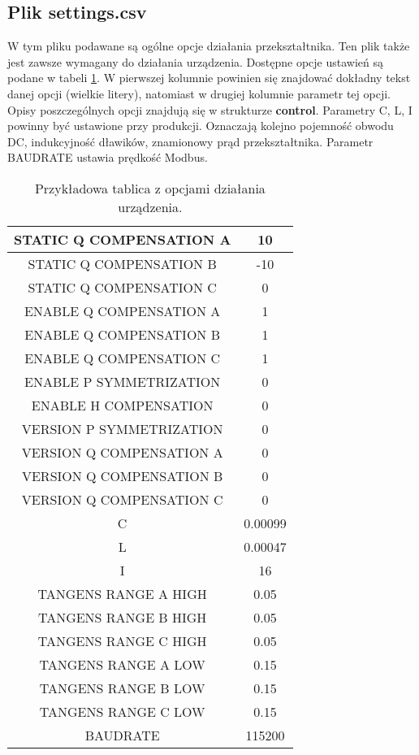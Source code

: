 \documentclass[12pt,a4paper]{article}
\begin{document}
\subsection{Plik settings.csv}
W tym pliku podawane są ogólne opcje działania przekształtnika. Ten plik także jest zawsze wymagany do działania urządzenia. Dostępne opcje ustawień są podane w tabeli \ref{tab:settings}. W pierwszej kolumnie powinien się znajdować dokładny tekst danej opcji (wielkie litery), natomiast w drugiej kolumnie parametr tej opcji. Opisy poszczególnych opcji znajdują się w strukturze \textbf{control}. Parametry C, L, I powinny być ustawione przy produkcji. Oznaczają kolejno pojemność obwodu DC, indukcyjność dławików, znamionowy prąd przekształtnika. Parametr BAUDRATE ustawia prędkość Modbus.

\begin{table}[]
	\centering
	\begin{tabular}{|c|c|}
		\hline
		STATIC Q COMPENSATION A & 10 \\ \hline
		STATIC Q COMPENSATION B & -10 \\ \hline
		STATIC Q COMPENSATION C & 0 \\ \hline
		ENABLE Q COMPENSATION A & 1 \\ \hline
		ENABLE Q COMPENSATION B & 1 \\ \hline
		ENABLE Q COMPENSATION C & 1 \\ \hline
		ENABLE P SYMMETRIZATION & 0 \\ \hline
		ENABLE H COMPENSATION & 0 \\ \hline
		VERSION P SYMMETRIZATION & 0 \\ \hline
		VERSION Q COMPENSATION A & 0 \\ \hline
		VERSION Q COMPENSATION B & 0 \\ \hline
		VERSION Q COMPENSATION C & 0 \\ \hline
		C & 0.00099 \\ \hline
		L & 0.00047 \\ \hline
		I & 16 \\ \hline
		TANGENS RANGE A HIGH & 0.05 \\ \hline
		TANGENS RANGE B HIGH & 0.05 \\ \hline
		TANGENS RANGE C HIGH & 0.05 \\ \hline
		TANGENS RANGE A LOW & 0.15 \\ \hline
		TANGENS RANGE B LOW & 0.15 \\ \hline
		TANGENS RANGE C LOW & 0.15 \\ \hline
		BAUDRATE & 115200 \\ \hline
	\end{tabular}
\caption{\label{tab:settings}Przykładowa tablica z opcjami działania urządzenia.}
\end{table}
\end{document}
